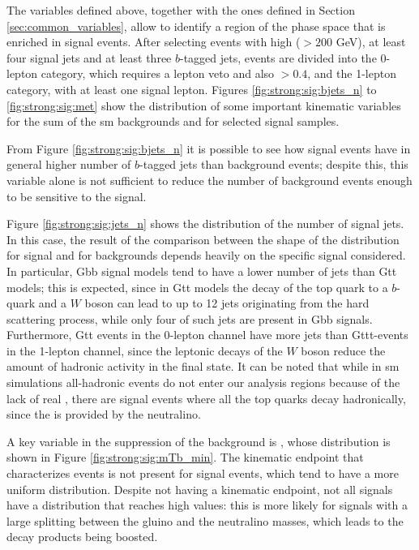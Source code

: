 The variables defined above, together with the ones defined in Section \ref{sec:common_variables},
allow to 
identify a region of the phase space that is enriched in signal events. 
After selecting events with high \met ($> 200$ GeV), at least four signal jets and at least three $b$-tagged jets, events are
divided into the 0-lepton category, which requires a lepton veto and also \dphimin $>0.4$, and the 1-lepton category, 
with at least one signal lepton.
Figures \ref{fig:strong:sig:bjets_n} to \ref{fig:strong:sig:met} show the distribution of some important kinematic variables for 
the sum of the \gls{sm} backgrounds and for selected signal samples. 

From Figure \ref{fig:strong:sig:bjets_n} it is possible to see how signal events have in general higher number of 
$b$-tagged jets than background events; despite this, this variable alone is not sufficient to reduce the number of 
background events enough to be sensitive to the signal.

Figure \ref{fig:strong:sig:jets_n} shows the distribution of the number of signal jets. 
In this case, the result of the comparison between the shape of the distribution for signal and for backgrounds depends heavily 
on the specific signal considered. In particular, Gbb signal models tend to have a lower number of jets than Gtt models; 
this is expected, since in Gtt models the decay of the top quark to a $b$-quark and a $W$ boson can lead to up to 12 jets originating from the 
hard scattering process, while only four of such jets are present in Gbb signals. 
Furthermore, Gtt events in the 0-lepton channel have more jets than Gttt-events in the 1-lepton channel, since the leptonic decays of the $W$ boson 
reduce the amount of hadronic activity in the final state. 
It can be noted that while in \gls{sm} simulations all-hadronic \ttbar events do not enter our analysis regions because of the lack of real \met,  there are signal events where all the top quarks decay hadronically, since the \met is provided by the neutralino. 

A key variable in the suppression of the \ttbar background is \mtb, whose distribution is shown in Figure \ref{fig:strong:sig:mTb_min}.
The kinematic endpoint that characterizes \ttbar events is not present for signal events, which tend to have a more uniform distribution.
Despite not having a kinematic endpoint, not all signals have a \mtb distribution that reaches high values: this is more likely for 
signals with a large splitting between the gluino and the neutralino masses, which leads to the decay products being boosted.

